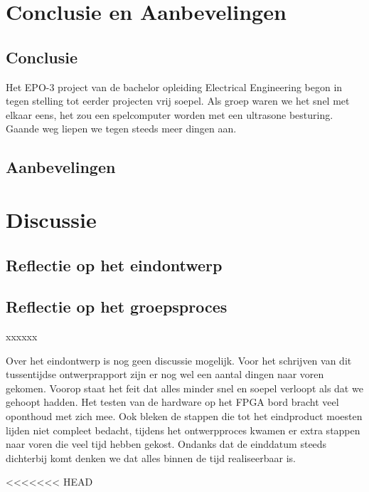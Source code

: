 \documentclass[oneside,dutch]{tudelft-report}
\begin{document}
\chapter{Conclusie en Aanbevelingen}
\section{Conclusie}
Het EPO-3 project van de bachelor opleiding Electrical Engineering begon in tegen stelling tot eerder projecten vrij soepel. Als groep waren we het snel met elkaar eens, het zou een spelcomputer worden met een ultrasone besturing. Gaande weg liepen we tegen steeds meer dingen aan. 

\section{Aanbevelingen}



\chapter{Discussie}
\section{Reflectie op het eindontwerp}

\section{Reflectie op het groepsproces}


xxxxxx

Over het eindontwerp is nog geen discussie mogelijk. Voor het schrijven van dit tussentijdse ontwerprapport zijn er nog wel een aantal dingen naar voren gekomen. Voorop staat het feit dat alles minder snel en soepel verloopt als dat we gehoopt hadden. Het testen van de hardware op het FPGA bord bracht veel oponthoud met zich mee. Ook bleken de stappen die tot het eindproduct moesten lijden niet compleet bedacht, tijdens het ontwerpproces kwamen er extra stappen naar voren die veel tijd hebben gekost. Ondanks dat de einddatum steeds dichterbij komt denken we dat alles binnen de tijd realiseerbaar is.

<<<<<<< HEAD
\end{document}
